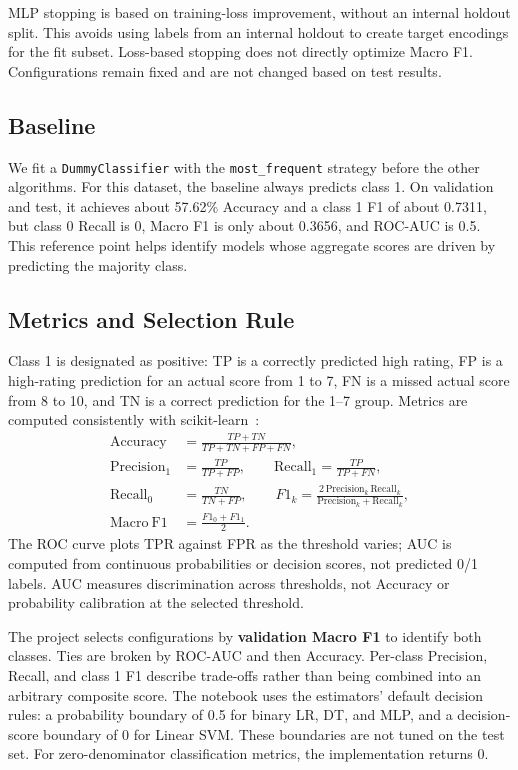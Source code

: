 \documentclass[12pt,a4paper]{article}
\newcommand{\code}[1]{\texttt{#1}}
\begin{document}
MLP stopping is based on training-loss improvement, without an internal holdout split. This avoids
using labels from an internal holdout to create target encodings for the fit subset. Loss-based
stopping does not directly optimize Macro F1. Configurations remain fixed and are not changed based
on test results.

\subsection{Baseline}
We fit a \code{DummyClassifier} with the \code{most\_frequent} strategy before the other algorithms. For this
dataset, the baseline always predicts class 1. On validation and test, it achieves about 57.62\%
Accuracy and a class 1 F1 of about 0.7311, but class 0 Recall is 0, Macro F1 is only about 0.3656,
and ROC-AUC is 0.5. This reference point helps identify models whose aggregate scores are driven
by predicting the majority class.

\subsection{Metrics and Selection Rule}
Class 1 is designated as positive: TP is a correctly predicted high rating, FP is a high-rating
prediction for an actual score from 1 to 7, FN is a missed actual score from 8 to 10, and TN is a
correct prediction for the 1--7 group. Metrics are computed consistently with scikit-learn~\cite{metrics}:
\begin{align}
 \mathrm{Accuracy} &= \frac{TP+TN}{TP+TN+FP+FN},\\
 \mathrm{Precision}_1 &= \frac{TP}{TP+FP},\qquad
 \mathrm{Recall}_1 = \frac{TP}{TP+FN},\\
 \mathrm{Recall}_0 &= \frac{TN}{TN+FP},\qquad
 F1_k = \frac{2\,\mathrm{Precision}_k\,\mathrm{Recall}_k}
 {\mathrm{Precision}_k+\mathrm{Recall}_k},\\
 \mathrm{Macro\ F1} &= \frac{F1_0+F1_1}{2}.
\end{align}
The ROC curve plots TPR against FPR as the threshold varies; AUC is computed from continuous
probabilities or decision scores, not predicted 0/1 labels. AUC measures discrimination across
thresholds, not Accuracy or probability calibration at the selected threshold.

The project selects configurations by \textbf{validation Macro F1} to identify both classes. Ties
are broken by ROC-AUC and then Accuracy. Per-class Precision, Recall, and class 1 F1 describe
trade-offs rather than being combined into an arbitrary composite score. The notebook uses the estimators' default decision rules: a probability boundary of 0.5 for
binary LR, DT, and MLP, and a decision-score boundary of 0 for Linear SVM. These boundaries are not
tuned on the test set. For zero-denominator classification metrics, the implementation returns 0.
\FloatBarrier
\end{document}
